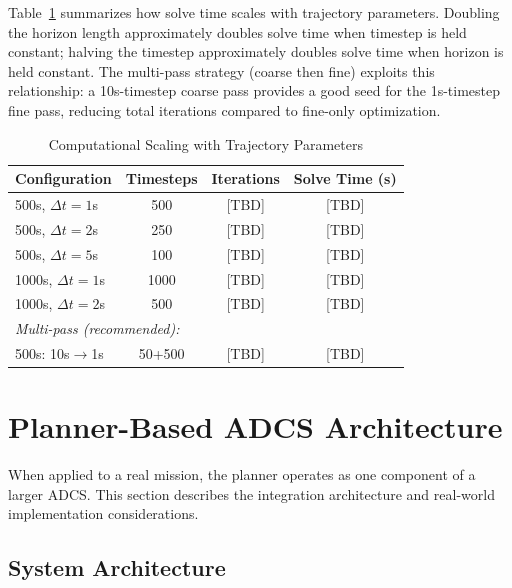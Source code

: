 \documentclass[conference]{IEEEtran}
\begin{document}
Table~\ref{tab:complexity} summarizes how solve time scales with trajectory parameters. Doubling the horizon length approximately doubles solve time when timestep is held constant; halving the timestep approximately doubles solve time when horizon is held constant. The multi-pass strategy (coarse then fine) exploits this relationship: a 10s-timestep coarse pass provides a good seed for the 1s-timestep fine pass, reducing total iterations compared to fine-only optimization.

\begin{table}[t]
    \centering
    \caption{Computational Scaling with Trajectory Parameters}
    \label{tab:complexity}
    \begin{tabular}{lccc}
        \toprule
        Configuration & Timesteps & Iterations & Solve Time (s) \\
        \midrule
        500s, $\Delta t=1$s & 500 & [TBD] & [TBD] \\
        500s, $\Delta t=2$s & 250 & [TBD] & [TBD] \\
        500s, $\Delta t=5$s & 100 & [TBD] & [TBD] \\
        1000s, $\Delta t=1$s & 1000 & [TBD] & [TBD] \\
        1000s, $\Delta t=2$s & 500 & [TBD] & [TBD] \\
        \midrule
        \multicolumn{4}{l}{\textit{Multi-pass (recommended):}} \\
        500s: 10s$\rightarrow$1s & 50+500 & [TBD] & [TBD] \\
        \bottomrule
    \end{tabular}
\end{table}

\section{Planner-Based ADCS Architecture}\label{sec:architecture}

When applied to a real mission, the planner operates as one component of a larger ADCS. This section describes the integration architecture and real-world implementation considerations.

\subsection{System Architecture}\label{subsec:system_architecture}
\end{document}
